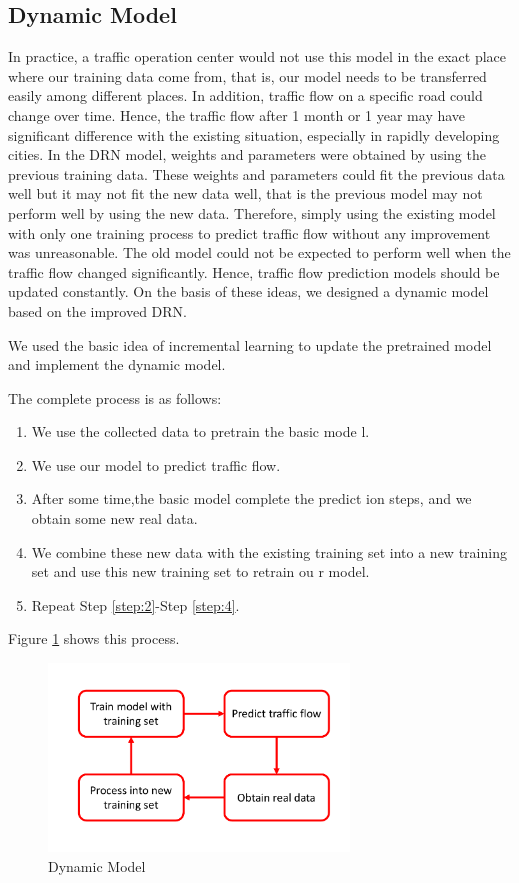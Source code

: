 \documentclass[twocolumn]{article}
\begin{document}
\subsection{Dynamic Model} \label{sec:dyna}
In practice, a traffic operation center would not use this model in the exact place where our training data come from, that is, our model needs to be transferred easily among different places. In addition, traffic flow on a specific road could change over time. Hence, the traffic flow after 1 month or 1 year may have significant difference with the existing situation, especially in rapidly developing cities.  In the DRN model, weights and parameters were obtained by using the previous training data. These weights and parameters could fit the previous data well but it may not fit the new data well, that is the previous model may not perform well by using the new data. Therefore, simply using the existing model with only one training process to predict traffic flow without any improvement was unreasonable. The old model could not be expected to perform well when the traffic flow changed significantly. Hence, traffic flow prediction models should be updated constantly. On the basis of these ideas, we designed a dynamic model based on the improved DRN.
\par
We used the basic idea of incremental learning to update the pretrained model and implement the dynamic model. 
\par
The complete process is as follows:
\begin{enumerate}[Step 1]
    \item\label{step:1} We use the collected data to pretrain the basic mode    l.
    \item\label{step:2} We use our model to predict traffic flow.
    \item\label{step:3} After some time,the basic model complete the predict    ion steps, and we obtain some new real data.
    \item\label{step:4} We combine these new data with the existing training     set into a new training set and use this new training set to retrain ou    r model.
    \item\label{step:5} Repeat Step \ref{step:2}-Step \ref{step:4}.
\end{enumerate}
\par
Figure \ref{fig:steps} shows this process.

\begin{figure}
    \centering
    \includegraphics[width=8cm]{fig/Steps.pdf}
    \caption{Dynamic Model}
    \label{fig:steps}
\end{figure}
\end{document}
